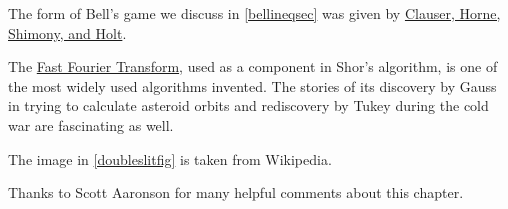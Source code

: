 The form of Bell's game we discuss in \cref{bellineqsec} was given by
\href{https://goo.gl/wvJGZU}{Clauser, Horne, Shimony, and Holt}.

The \href{https://en.wikipedia.org/wiki/Fast_Fourier_transform}{Fast
Fourier Transform}, used as a component in Shor's algorithm, is one of
the most widely used algorithms invented. The stories of its discovery
by Gauss in trying to calculate asteroid orbits and rediscovery by Tukey
during the cold war are fascinating as well.

The image in \cref{doubleslitfig} is taken from Wikipedia.

Thanks to Scott Aaronson for many helpful comments about this chapter.

